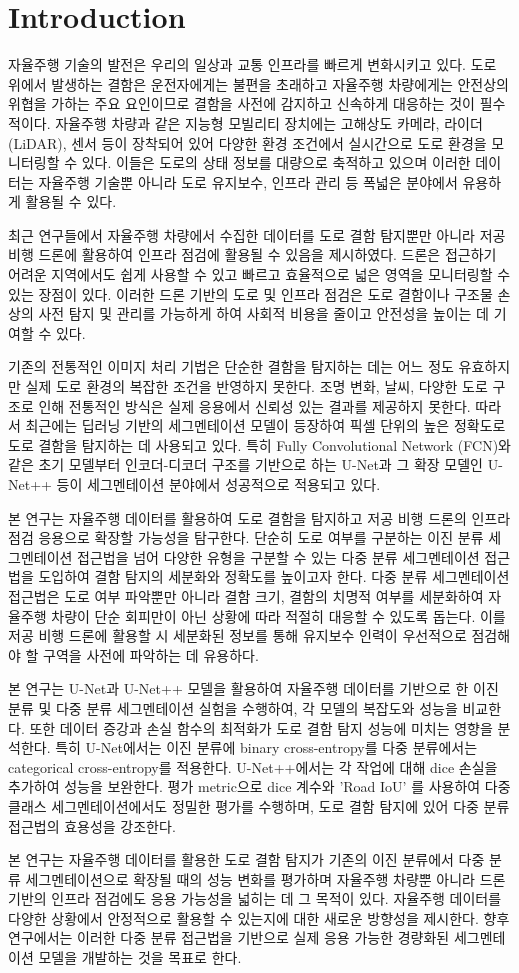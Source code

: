 \section{Introduction}

자율주행 기술의 발전은 우리의 일상과 교통 인프라를 빠르게 변화시키고 있다. 도로 위에서 발생하는 결함은 운전자에게는 불편을 초래하고 자율주행 차량에게는 안전상의 위협을 가하는 주요 요인이므로 결함을 사전에 감지하고 신속하게 대응하는 것이 필수적이다. 자율주행 차량과 같은 지능형 모빌리티 장치에는 고해상도 카메라, 라이더(LiDAR), 센서 등이 장착되어 있어 다양한 환경 조건에서 실시간으로 도로 환경을 모니터링할 수 있다. 이들은 도로의 상태 정보를 대량으로 축적하고 있으며 이러한 데이터는 자율주행 기술뿐 아니라 도로 유지보수, 인프라 관리 등 폭넓은 분야에서 유용하게 활용될 수 있다.

최근 연구들에서 자율주행 차량에서 수집한 데이터를 도로 결함 탐지뿐만 아니라 저공 비행 드론에 활용하여 인프라 점검에 활용될 수 있음을 제시하였다. 드론은 접근하기 어려운 지역에서도 쉽게 사용할 수 있고 빠르고 효율적으로 넓은 영역을 모니터링할 수 있는 장점이 있다. 이러한 드론 기반의 도로 및 인프라 점검은 도로 결함이나 구조물 손상의 사전 탐지 및 관리를 가능하게 하여 사회적 비용을 줄이고 안전성을 높이는 데 기여할 수 있다. 

기존의 전통적인 이미지 처리 기법은 단순한 결함을 탐지하는 데는 어느 정도 유효하지만 실제 도로 환경의 복잡한 조건을 반영하지 못한다. 조명 변화, 날씨, 다양한 도로 구조로 인해 전통적인 방식은 실제 응용에서 신뢰성 있는 결과를 제공하지 못한다. 따라서 최근에는 딥러닝 기반의 세그멘테이션 모델이 등장하여 픽셀 단위의 높은 정확도로 도로 결함을 탐지하는 데 사용되고 있다. 특히 Fully Convolutional Network (FCN)와 같은 초기 모델부터 인코더-디코더 구조를 기반으로 하는 U-Net과 그 확장 모델인 U-Net++ 등이 세그멘테이션 분야에서 성공적으로 적용되고 있다.

본 연구는 자율주행 데이터를 활용하여 도로 결함을 탐지하고 저공 비행 드론의 인프라 점검 응용으로 확장할 가능성을 탐구한다. 단순히 도로 여부를 구분하는 이진 분류 세그멘테이션 접근법을 넘어 다양한 유형을 구분할 수 있는 다중 분류 세그멘테이션 접근법을 도입하여 결함 탐지의 세분화와 정확도를 높이고자 한다. 다중 분류 세그멘테이션 접근법은 도로 여부 파악뿐만 아니라 결함 크기, 결함의 치명적 여부를 세분화하여 자율주행 차량이 단순 회피만이 아닌 상황에 따라 적절히 대응할 수 있도록 돕는다. 이를 저공 비행 드론에 활용할 시 세분화된 정보를 통해 유지보수 인력이 우선적으로 점검해야 할 구역을 사전에 파악하는 데 유용하다.

본 연구는 U-Net과 U-Net++ 모델을 활용하여 자율주행 데이터를 기반으로 한 이진 분류 및 다중 분류 세그멘테이션 실험을 수행하여, 각 모델의 복잡도와 성능을 비교한다. 또한 데이터 증강과 손실 함수의 최적화가 도로 결함 탐지 성능에 미치는 영향을 분석한다. 특히 U-Net에서는 이진 분류에 binary cross-entropy를 다중 분류에서는 categorical cross-entropy를 적용한다. U-Net++에서는 각 작업에 대해 dice 손실을 추가하여 성능을 보완한다. 평가 metric으로 dice 계수와 'Road IoU' 를 사용하여 다중 클래스 세그멘테이션에서도 정밀한 평가를 수행하며, 도로 결함 탐지에 있어 다중 분류 접근법의 효용성을 강조한다.

본 연구는 자율주행 데이터를 활용한 도로 결함 탐지가 기존의 이진 분류에서 다중 분류 세그멘테이션으로 확장될 때의 성능 변화를 평가하며 자율주행 차량뿐 아니라 드론 기반의 인프라 점검에도 응용 가능성을 넓히는 데 그 목적이 있다. 자율주행 데이터를 다양한 상황에서 안정적으로 활용할 수 있는지에 대한 새로운 방향성을 제시한다. 향후 연구에서는 이러한 다중 분류 접근법을 기반으로 실제 응용 가능한 경량화된 세그멘테이션 모델을 개발하는 것을 목표로 한다.
